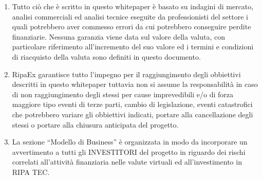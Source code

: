 \begin{scriptsize}
{\begin{enumerate}
			a proteggere le informazioni confidenziali,  assicurando che non venga in alcun modo compromesso il carattere della loro riservatezza 
			anche da parte dei propri collaboratori/dipendenti/consulenti.
			Qualsiasi riproduzione totale o parziale del contenuto di questo Whitepaper, dei marchi, logo, disegni, grafici, testi e delle 
			analisi presenti nel documento, nonché qualsivoglia comunicazione a terzi o utilizzo diverso da quello privato sono formalmente proibiti. 
			Questi dati sono destinati esclusivamente all'utilizzo privato da parte dell’Utente. In caso di infrazione, l'utente si assume 
			la responsabilità delle proprie azioni e si espone a procedimenti giudiziari, in particolare per contraffazione.
			L'obbligo di confidenzialità vincola, oltre al ricevente, il proprio consulente professionale, l'amministratore, il dipendente
			o qualsiasi altra persona che prenderà parte al progetto RipaEx come l'esecutore dello stesso ovvero i suoi beneficiari.
			\item Tutto ciò che è scritto in questo whitepaper è basato su indagini di mercato, analisi commerciali ed analisi tecnice 
			eseguite da professionisti del settore i quali potrebbero aver commesso errori da cui potrebbero conseguire perdite finanziarie. 
			Nessuna garanzia viene data sul valore della valuta, con particolare riferimento all'incremento del suo valore ed i termini e
			condizioni di riacquisto della valuta sono definiti in questo documento.
			\item RipaEx garantisce tutto l'impegno per il raggiungimento degli obbiettivi descritti in questo
			whitepaper tuttavia non si assume la responsabilità in caso di non raggiungimento degli stessi per cause imprevedibili e/o 
			di forza maggiore tipo eventi di terze parti, cambio di legislazione, eventi catastrofici che potrebbero variare gli obbiettivi indicati,
			portare alla cancellazione degli stessi o portare alla chiusura anticipata del progetto.
			\item La sezione ``Modello di Business'' è organizzata in modo da incorporare un avvertimento
			a tutti gli INVESTITORI del progetto in riguardo dei rischi correlati all'attività finanziaria nelle valute virtuali ed
			all'investimento in RIPA TEC.
		\end{enumerate}		
	}
\end{scriptsize}
